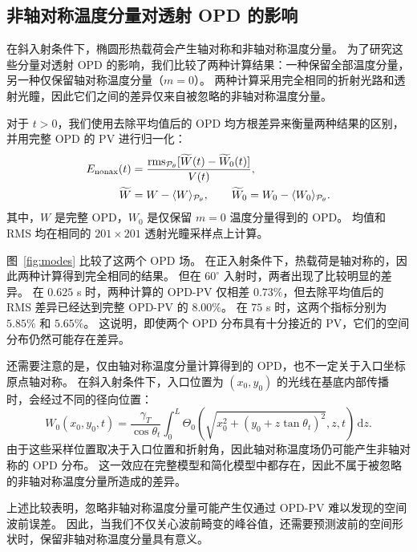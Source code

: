 \documentclass{optica-article}
\newcommand{\dd}{\,\mathrm{d}}
\begin{document}
\subsection{非轴对称温度分量对透射 OPD 的影响}
在斜入射条件下，椭圆形热载荷会产生轴对称和非轴对称温度分量。
为了研究这些分量对透射 OPD 的影响，我们比较了两种计算结果：一种保留全部温度分量，另一种仅保留轴对称温度分量（$m=0$）。
两种计算采用完全相同的折射光路和透射光瞳，因此它们之间的差异仅来自被忽略的非轴对称温度分量。

对于 $t>0$，我们使用去除平均值后的 OPD 均方根差异来衡量两种结果的区别，并用完整 OPD 的 PV 进行归一化：
\begin{equation}
 \begin{aligned}
 E_{\rm nonax}(t)&=
 \frac{\operatorname{rms}_{\mathcal P_\theta}
 [\widetilde W(t)-\widetilde W_0(t)]}{V(t)},\\
 \widetilde W&=W-\langle W\rangle_{\mathcal P_\theta},\qquad
 \widetilde W_0=W_0-\langle W_0\rangle_{\mathcal P_\theta}.
 \end{aligned}
 \label{eq:nonax-omission}
\end{equation}
其中，$W$ 是完整 OPD，$W_0$ 是仅保留 $m=0$ 温度分量得到的 OPD。
均值和 RMS 均在相同的 $201\times201$ 透射光瞳采样点上计算。

图~\ref{fig:modes} 比较了这两个 OPD 场。
在正入射条件下，热载荷是轴对称的，因此两种计算得到完全相同的结果。
但在 $60^\circ$ 入射时，两者出现了比较明显的差异。
在 $0.625$ s 时，两种计算的 OPD-PV 仅相差 $0.73\%$，但去除平均值后的 RMS 差异已经达到完整 OPD-PV 的 $8.00\%$。
在 $75$ s 时，这两个指标分别为 $5.85\%$ 和 $5.65\%$。
这说明，即使两个 OPD 分布具有十分接近的 PV，它们的空间分布仍然可能存在差异。

还需要注意的是，仅由轴对称温度分量计算得到的 OPD，也不一定关于入口坐标原点轴对称。
在斜入射条件下，入口位置为 $(x_0,y_0)$ 的光线在基底内部传播时，会经过不同的径向位置：
\begin{equation}
 W_0(x_0,y_0,t)=\frac{\gamma_T}{\cos\theta_t}
 \int_0^L\Theta_0\!\left(
 \sqrt{x_0^2+(y_0+z\tan\theta_t)^2},z,t\right)\dd z.
 \label{eq:axisymmetric-thermal-opd}
\end{equation}
由于这些采样位置取决于入口位置和折射角，因此轴对称温度场仍可能产生非轴对称的 OPD 分布。
这一效应在完整模型和简化模型中都存在，因此不属于被忽略的非轴对称温度分量所造成的差异。

上述比较表明，忽略非轴对称温度分量可能产生仅通过 OPD-PV 难以发现的空间波前误差。
因此，当我们不仅关心波前畸变的峰谷值，还需要预测波前的空间形状时，保留非轴对称温度分量具有意义。
\end{document}
